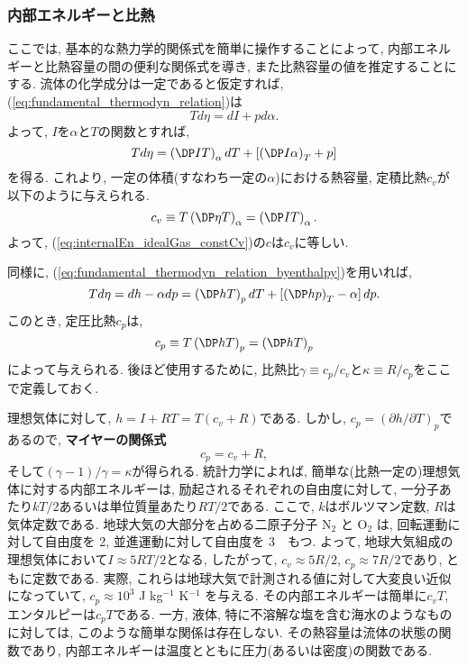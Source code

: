 \subsubsection*{内部エネルギーと比熱}
ここでは, 基本的な熱力学的関係式を簡単に操作することによって, 
内部エネルギーと比熱容量の間の便利な関係式を導き, また比熱容量の値を推定することにする. 
流体の化学成分は一定であると仮定すれば, 
(\ref{eq:fundamental_thermodyn_relation})は
\begin{equation}
 Td\eta = dI + pd\alpha. 
\end{equation}
よって, $I$を$\alpha$と$T$の関数とすれば, 
\begin{equation}
 Td\eta = \DPext{I}{T}{\alpha}dT + \left[\DPext{I}{\alpha}{T} + p\right]
\end{equation}
を得る. 
これより, 一定の体積(すなわち一定の$\alpha$)における熱容量, 定積比熱$c_v$が以下のように与えられる. 
\begin{equation}
 c_v \equiv T\DPext{\eta}{T}{\alpha} = \DPext{I}{T}{\alpha}.
\end{equation}
よって, (\ref{eq:internalEn_idealGas_constCv})の$c$は$c_v$に等しい. 

同様に, (\ref{eq:fundamental_thermodyn_relation_byenthalpy})を用いれば, 
\begin{equation}
 Td\eta = dh - \alpha dp 
 = \DPext{h}{T}{p} dT + \left[\DPext{h}{p}{T} - \alpha \right] dp. 
\end{equation}
このとき, 定圧比熱$c_p$は, 
\begin{equation}
 c_p \equiv T \DPext{h}{T}{p} = \DPext{h}{T}{p}
\end{equation}
によって与えられる. 
後ほど使用するために, 比熱比$\gamma \equiv c_p/c_v$と$\kappa　\equiv　R/c_p$をここで定義しておく. 

理想気体に対して, $h=I+RT=T(c_v + R)$である. 
しかし, $c_p = (\partial h/\partial T)_p$であるので, 
\textbf{マイヤーの関係式}
\begin{equation}
 c_p = c_v + R, 
\end{equation}
そして$(\gamma - 1)/\gamma = \kappa$が得られる. 
統計力学によれば, 簡単な(比熱一定の)理想気体に対する内部エネルギーは,
励起されるそれぞれの自由度に対して, 一分子あたり$kT/2$あるいは単位質量あたり$RT/2$である. 
ここで, $k$はボルツマン定数, $R$は気体定数である. 
地球大気の大部分を占める二原子分子 N$_2$ と O$_2$ は, 回転運動に対して自由度を 2, 
並進運動に対して自由度を 3　もつ. 
よって, 地球大気組成の理想気体において$I \approx 5RT/2$となる, 
したがって, $c_v \approx 5R/2$, $c_p \approx 7R/2$であり, ともに定数である. 
実際, これらは地球大気で計測される値に対して大変良い近似になっていて, 
$c_p \approx 10^3$ J kg$^{-1}$ K$^{-1}$ を与える. 
その内部エネルギーは簡単に$c_v T$, エンタルピーは$c_p T$である. 
一方, 液体, 特に不溶解な塩を含む海水のようなものに対しては, 
このような簡単な関係は存在しない. 
その熱容量は流体の状態の関数であり, 内部エネルギーは温度とともに圧力(あるいは密度)の関数である. 
